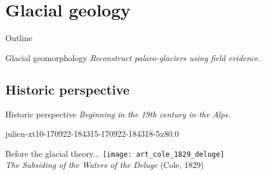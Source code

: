 \section{Glacial geology}

    \begin{sectionframe}{Outline}
      \begin{multicols}{2}
        \tableofcontents
      \end{multicols}
    \end{sectionframe}

    \begin{sectionframe}{Glacial geomorphology}
      \emph{Reconstruct palaeo-glaciers using field evidence.}
    \end{sectionframe}

\subsection{Historic perspective}

    \begin{sectionframe}{Historic perspective}
      \emph{Beginning in the 19th century in the Alps.}
    \end{sectionframe}


    \begin{backgroundframe}[b]{julien-xt10-170922-184315-170922-184318-5x8}{0.0}{}
    \end{backgroundframe}

    \begin{frame}{Before the glacial theory...}
      \texttt{[image: art\_cole\_1829\_deluge]}\\
      \emph{The Subsiding of the Waters of the Deluge} (Cole, 1829)
    \end{frame}


